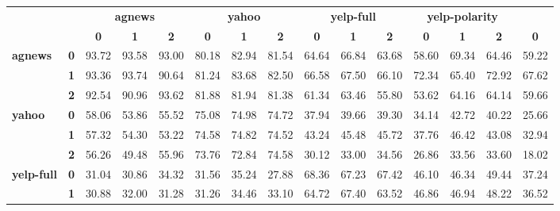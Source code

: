 \begin{table*}[h]
	\fontsize{8}{12}
	\selectfont
	\begin{tabular}{llccccccccccccc}
		\toprule
		&            & \multicolumn{3}{c}{\textbf{agnews}}  & \multicolumn{3}{c}{\textbf{yahoo}}   & \multicolumn{3}{c}{\textbf{yelp-full}} & \multicolumn{3}{c}{\textbf{yelp-polarity}} \\
		&            & \textbf{0} & \textbf{1} & \textbf{2} & \textbf{0} & \textbf{1} & \textbf{2} & \textbf{0}  & \textbf{1}  & \textbf{2} & \textbf{0}   & \textbf{1}   & \textbf{2}   & \textbf{0} \\
		\hline
		\multirow{3}{*}{\textbf{agnews}}        & \textbf{0} & 93.72      & 93.58      & 93.00      & 80.18      & 82.94      & 81.54      & 64.64       & 66.84       & 63.68      & 58.60        & 69.34        & 64.46        & 59.22      \\
		& \textbf{1} & 93.36      & 93.74      & 90.64      & 81.24      & 83.68      & 82.50      & 66.58       & 67.50       & 66.10      & 72.34        & 65.40        & 72.92        & 67.62      \\
		& \textbf{2} & 92.54      & 90.96      & 93.62      & 81.88      & 81.94      & 81.38      & 61.34       & 63.46       & 55.80      & 53.62        & 64.16        & 64.14        & 59.66      \\
		\hline
		\multirow{3}{*}{\textbf{yahoo}}         & \textbf{0} & 58.06      & 53.86      & 55.52      & 75.08      & 74.98      & 74.72      & 37.94       & 39.66       & 39.30      & 34.14        & 42.72        & 40.22        & 25.66      \\
		& \textbf{1} & 57.32      & 54.30      & 53.22      & 74.58      & 74.82      & 74.52      & 43.24       & 45.48       & 45.72      & 37.76        & 46.42        & 43.08        & 32.94      \\
		& \textbf{2} & 56.26      & 49.48      & 55.96      & 73.76      & 72.84      & 74.58      & 30.12       & 33.00       & 34.56      & 26.86        & 33.56        & 33.60        & 18.02      \\
		\hline
		\multirow{3}{*}{\textbf{yelp-full}}     & \textbf{0} & 31.04      & 30.86      & 34.32      & 31.56      & 35.24      & 27.88      & 68.36       & 67.23       & 67.42      & 46.10        & 46.34        & 49.44        & 37.24      \\
		& \textbf{1} & 30.88      & 32.00      & 31.28      & 31.26      & 34.46      & 33.10      & 64.72       & 67.40       & 63.52      & 46.86        & 46.94        & 48.22        & 36.52      \\

\end{tabular}
\end{table*}
